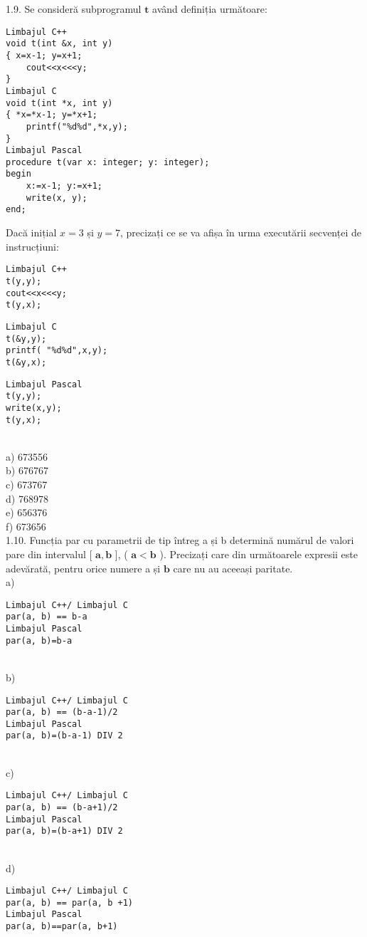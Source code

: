 1.9. Se consideră subprogramul $\mathbf{t}$ având definiția următoare:
\begin{verbatim}
Limbajul C++
void t(int &x, int y)
{ x=x-1; y=x+1;
    cout<<x<<<y;
}
Limbajul C
void t(int *x, int y)
{ *x=*x-1; y=*x+1;
    printf("%d%d",*x,y);
}
Limbajul Pascal
procedure t(var x: integer; y: integer);
begin
    x:=x-1; y:=x+1;
    write(x, y);
end;
\end{verbatim}
Dacă inițial $x=3$ și $y=7$, precizați ce se va afișa în urma executării secvenței de instrucțiuni:
\begin{verbatim}
Limbajul C++
t(y,y);
cout<<x<<<y;
t(y,x);
\end{verbatim}
\begin{verbatim}
Limbajul C
t(&y,y);
printf( "%d%d",x,y);
t(&y,x);
\end{verbatim}
\begin{verbatim}
Limbajul Pascal
t(y,y);
write(x,y);
t(y,x);
\end{verbatim}
\\
a) 673556
\\
b) 676767
\\
c) 673767
\\
d) 768978
\\
e) 656376
\\
f) 673656
\\
1.10. Funcția par cu parametrii de tip întreg a și b determină numărul de valori pare din intervalul [ $\mathbf{a}, \mathbf{b}$ ], ( $\mathbf{a}<\mathbf{b}$ ). Precizați care din următoarele expresii este adevărată, pentru orice numere a și $\mathbf{b}$ care nu au aceeași paritate.
\\
a) \begin{verbatim}
Limbajul C++/ Limbajul C
par(a, b) == b-a
Limbajul Pascal
par(a, b)=b-a
\end{verbatim}
\\
b) \begin{verbatim}
Limbajul C++/ Limbajul C
par(a, b) == (b-a-1)/2
Limbajul Pascal
par(a, b)=(b-a-1) DIV 2
\end{verbatim}
\\
c) \begin{verbatim}
Limbajul C++/ Limbajul C
par(a, b) == (b-a+1)/2
Limbajul Pascal
par(a, b)=(b-a+1) DIV 2
\end{verbatim}
\\
d) \begin{verbatim}
Limbajul C++/ Limbajul C
par(a, b) == par(a, b +1)
Limbajul Pascal
par(a, b)==par(a, b+1)
\end{verbatim}
